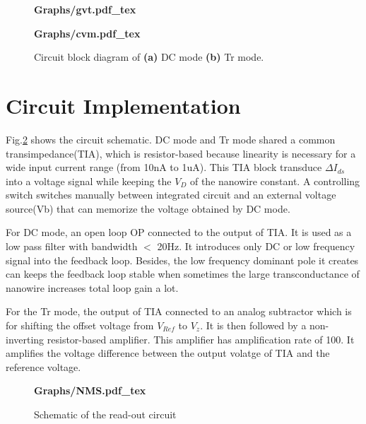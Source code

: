 \documentclass{article}
\begin{document}
\begin{figure}[!tb]

    \begin{minipage}[htb][3cm][t]{0.18\linewidth}
        \textbf{
        \centering
        \def\svgwidth{2.62cm}
        \fontsize{6}{15}\selectfont
         {Graphs/gvt.pdf_tex}
        }
    \end{minipage}
    \hfill
    \begin{minipage}[htb][3cm][t]{0.65\linewidth}
        \textbf{
        \centering
        \def\svgwidth{4.3cm}
        \fontsize{6}{15}\selectfont
         {Graphs/cvm.pdf_tex}
        }
    \end{minipage}
    \vfill
    \makebox[1\linewidth][l]{}
    \caption{Circuit block diagram of \textbf{(a)} DC mode \textbf{(b)} Tr mode.}
    \label{fig:mode}
\end{figure}

\section{Circuit Implementation}
Fig.\ref{fig:NMS} shows the circuit schematic.
DC mode and Tr mode shared a common transimpedance(TIA), which is resistor-based because linearity is necessary for a wide input current range (from 10nA to 1uA).
This TIA block transduce $\Delta I_{ds}$ into a voltage signal while keeping the $V_{D}$ of the nanowire constant.
A controlling switch switches manually between integrated circuit and an external voltage source(Vb) that can memorize the voltage obtained by DC mode.

For DC mode, an open loop OP connected to the output of TIA.
It is used as a low pass filter with bandwidth $<$ 20Hz.
It introduces only DC or low frequency signal into the feedback loop.
Besides, the low frequency dominant pole it creates can keeps the feedback loop stable when sometimes the large transconductance of nanowire increases total loop gain a lot.

For the Tr mode, the output of TIA connected to an analog subtractor which is for shifting the offset voltage from $V_{Ref}$ to $V_z$.
It is then followed by a non-inverting resistor-based amplifier.
This amplifier has amplification rate of 100.
It amplifies the voltage difference between the output volatge of TIA and the reference voltage.

\begin{figure}[!htb]
    \textbf{
        \centering
        \def\svgwidth{8.0cm}
        \fontsize{6}{15}\selectfont
         {Graphs/NMS.pdf_tex}
    }
    \caption{Schematic of the read-out circuit}
    \label{fig:NMS}
\end{figure}
\end{document}
